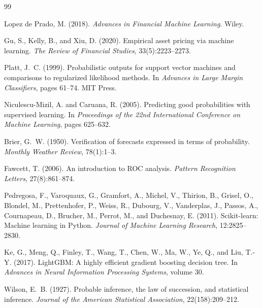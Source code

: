 \documentclass[11pt]{article}
\begin{document}
\begin{thebibliography}{99}

Lopez de Prado, M. (2018).
\newblock \emph{Advances in Financial Machine Learning}.
\newblock Wiley.

Gu, S., Kelly, B., and Xiu, D. (2020).
\newblock Empirical asset pricing via machine learning.
\newblock \emph{The Review of Financial Studies}, 33(5):2223--2273.

Platt, J.~C. (1999).
\newblock Probabilistic outputs for support vector machines and comparisons to
regularized likelihood methods.
\newblock In \emph{Advances in Large Margin Classifiers}, pages 61--74. MIT
Press.

Niculescu-Mizil, A. and Caruana, R. (2005).
\newblock Predicting good probabilities with supervised learning.
\newblock In \emph{Proceedings of the 22nd International Conference on Machine
Learning}, pages 625--632.

Brier, G.~W. (1950).
\newblock Verification of forecasts expressed in terms of probability.
\newblock \emph{Monthly Weather Review}, 78(1):1--3.

Fawcett, T. (2006).
\newblock An introduction to ROC analysis.
\newblock \emph{Pattern Recognition Letters}, 27(8):861--874.

Pedregosa, F., Varoquaux, G., Gramfort, A., Michel, V., Thirion, B.,
Grisel, O., Blondel, M., Prettenhofer, P., Weiss, R., Dubourg, V.,
Vanderplas, J., Passos, A., Cournapeau, D., Brucher, M., Perrot, M., and
Duchesnay, E. (2011).
\newblock Scikit-learn: Machine learning in Python.
\newblock \emph{Journal of Machine Learning Research}, 12:2825--2830.

Ke, G., Meng, Q., Finley, T., Wang, T., Chen, W., Ma, W., Ye, Q., and
Liu, T.-Y. (2017).
\newblock LightGBM: A highly efficient gradient boosting decision tree.
\newblock In \emph{Advances in Neural Information Processing Systems}, volume
30.

Wilson, E.~B. (1927).
\newblock Probable inference, the law of succession, and statistical inference.
\newblock \emph{Journal of the American Statistical Association},
22(158):209--212.


\end{thebibliography}
\end{document}
